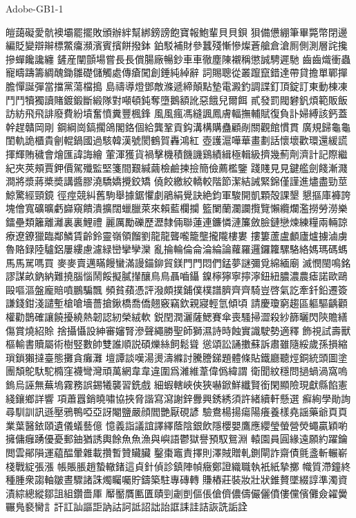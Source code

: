 Adobe-GB1-1

皚藹礙愛骯襖壩罷擺敗頒辦絆幫綁鎊謗飽寶報鮑輩⾙貝鋇
狽備憊綳筆畢斃幣閉邊編貶變辯辮標鱉癟瀕濱賓擯餅撥鉢
鉑駁補財參蠶殘慚慘燦蒼艙倉滄厠側測層詫攙摻蟬饞讒纏
鏟産闡顫場嘗⾧長償腸廠暢鈔⾞車徹塵陳襯稱懲誠騁遲馳
⿒齒熾衝蟲寵疇躊籌綢醜鋤雛礎儲觸處傳瘡闖創錘純綽辭
詞賜聰從叢躥竄錯達帶貸擔單鄲撣膽憚誕彈當擋黨蕩檔搗
島禱導燈鄧敵滌遞締顛點墊電澱釣調諜釘頂錠訂東動棟凍
⾾鬥犢獨讀賭鍍鍛斷緞隊對噸頓鈍奪墮鵝額訛惡餓兒爾餌
貳發罰閥礬釩煩範販飯訪紡⾶飛誹廢費紛墳奮憤糞豐楓鋒
⾵風瘋馮縫諷鳳膚輻撫輔賦復負訃婦縛該鈣蓋幹趕贛岡剛
鋼綱崗鎬擱鴿閣鉻個給龔鞏貢鈎溝構購蠱顧剮關觀館慣貫
廣規歸⿔龜閨軌詭櫃貴劊輥鍋國過駭韓漢號閡鶴賀轟鴻紅
壺護滬嘩華畫劃話懷壞歡環還緩謊揮輝賄穢會燴匯諱誨繪
葷渾獲貨禍擊機積饑譏鷄績緝極輯級擠幾薊劑濟計記際繼
紀夾莢頰賈鉀價駕殲監堅箋間艱緘繭檢鹼揀撿簡儉薦檻鑒
踐賤⾒見鍵艦劍餞漸濺澗將漿蔣槳奬講醬膠澆驕嬌攪鉸矯
僥餃繳絞轎較階節潔結誡緊錦僅謹進燼盡勁莖鯨驚經頸鏡
徑痙競糾舊駒舉據鋸懼劇鵑絹覺訣絶鈞軍駿開凱顆殻課墾
懇摳庫褲誇塊儈寬礦曠虧巋窺饋潰擴闊蠟臘萊來賴藍欄攔
籃闌蘭瀾讕攬覽懶纜爛濫撈勞澇樂鐳壘類籬離灕裏裏鯉禮
麗厲勵礫歷瀝隸倆聯蓮連鐮憐漣簾斂臉鏈戀煉練糧兩輛諒
療遼鐐獵臨鄰鱗賃齡鈴靈嶺領餾劉⿓龍聾嚨籠壟攏隴樓婁
摟簍蘆盧顱廬爐擄滷虜魯賂録陸驢鋁屢縷慮濾緑巒攣孿灤
亂掄輪倫侖淪綸論蘿羅邏鑼籮騾駱絡媽瑪碼螞⾺馬駡嗎買
⿆麥賣邁瞞饅蠻滿謾錨鉚貿鎂⾨門悶們錳夢謎彌覓綿緬廟
滅憫閩鳴銘謬謀畝鈉納難撓腦惱鬧餒擬膩攆釀⿃鳥聶嚙鑷
鎳檸獰寧擰濘鈕紐膿濃農瘧諾歐鷗毆嘔漚盤龐賠噴鵬騙飄
頻貧蘋憑評潑頗撲鋪僕樸譜臍⿑齊騎豈啓氣訖牽釺鉛遷簽
謙錢鉗淺譴塹槍嗆墻薔搶鍬橋喬僑翹竅竊欽親寢輕氫傾頃
請慶瓊窮趨區軀驅齲顴權勸鵲確讓饒擾繞熱韌認紉榮絨軟
鋭閏潤灑薩鰓賽傘喪騷掃澀殺紗篩曬閃陝贍繕傷賞燒紹賒
捨攝懾設紳審嬸腎滲聲繩勝聖師獅濕詩時蝕實識駛勢適釋
飾視試壽獸樞輸書贖屬術樹竪數帥雙誰順説碩爍絲飼鬆聳
慫頌訟誦擻蘇訴肅雖隨綏歲孫損縮瑣鎖獺撻臺態攤貪癱灘
壇譚談嘆湯燙濤縧討騰謄銻題體條貼鐵廳聽烴銅統頭圖塗
團頽鴕馱駝橢窪襪彎灣頑萬網⾱韋違圍爲濰維葦偉僞緯謂
衛聞紋穩問撾蝸渦窩嗚鎢烏誣無蕪塢霧務誤錫犧襲習銑戲
細蝦轄峽俠狹嚇鍁鮮纖賢銜閑顯險現獻縣餡憲綫鑲鄉詳響
項蕭囂銷曉嘯協挾脅諧寫瀉謝鋅釁興銹綉須許緒續軒懸選
癬絢學勛詢尋馴訓訊遜壓鴉鴨啞亞訝閹鹽嚴顔閻艷厭硯諺
驗鴦楊揚瘍陽癢養樣堯謡藥爺⾴頁業葉醫銥頤遺儀蟻藝億
憶義詣議誼譯繹蔭陰銀飲隱櫻嬰鷹應纓瑩螢營熒蠅贏穎喲
擁傭癰踴優憂郵鈾猶誘輿餘⿂魚漁與嶼語鬱獄譽預馭鴛淵
轅園員圓緣遠願約躍鑰閲雲鄖隕運藴醖暈雜載攢暫贊贜臟
鑿棗竈責擇則澤賊贈軋鍘閘詐齋債氈盞斬輾嶄棧戰綻張漲
帳賬脹趙蟄轍鍺這貞針偵診鎮陣幀癥鄭證織職執衹紙摯擲
幟質滯鐘終種腫衆謅軸皺晝驟諸誅燭矚囑貯鑄築駐專磚轉
賺樁莊裝妝壯狀錐贅墜綴諄準濁資漬綜總縱鄒詛組鑽嗇厙
厴靨贋匭匱賾剄劌剴傴倀傖儕儂儔儼儷僨僂儻儐儺僉糴黌
囅鳬褻臠訁訐訌訕謳詎訥詁訶詆詔詘詒誆誄詿詰詼詵詬詮
